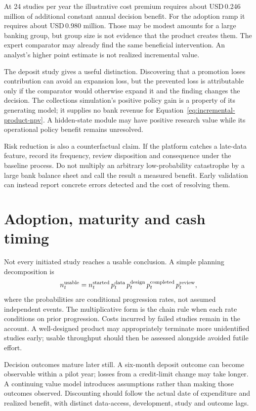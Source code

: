 At 24 studies per year the illustrative cost premium requires about
USD\,0.246 million of additional constant annual decision benefit.
For the adoption ramp it requires about USD\,0.980 million. Those may be
modest amounts for a large banking group, but group size is not evidence
that the product creates them. The expert comparator may already find the
same beneficial intervention. An analyst's higher point estimate is not
realized incremental value.

The deposit study gives a useful distinction. Discovering that a promotion
loses contribution can avoid an expansion loss, but the prevented loss is
attributable only if the comparator would otherwise expand it and the
finding changes the decision. The collections simulation's positive policy
gain is a property of its generating model; it supplies no bank revenue
for Equation~\eqref{eq:incremental-product-npv}. A hidden-state module may
have positive research value while its operational policy benefit remains
unresolved.

Risk reduction is also a counterfactual claim. If the platform catches a
late-data feature, record its frequency, review disposition and consequence
under the baseline process. Do not multiply an arbitrary low-probability
catastrophe by a large bank balance sheet and call the result a measured
benefit. Early validation can instead report concrete errors detected and
the cost of resolving them.

\section{Adoption, maturity and cash timing}
Not every initiated study reaches a usable conclusion. A simple planning
decomposition is
\[
 n_t^{\rm usable}=n_t^{\rm started}\,
 p_t^{\rm data}\,p_t^{\rm design}\,p_t^{\rm completed}
 \,p_t^{\rm review},
\]
where the probabilities are conditional progression rates, not assumed
independent events. The multiplicative form is the chain rule when each
rate conditions on prior progression. Costs incurred by failed studies
remain in the account. A well-designed product may appropriately terminate
more unidentified studies early; usable throughput should then be assessed
alongside avoided futile effort.

Decision outcomes mature later still. A six-month deposit outcome can
become observable within a pilot year; losses from a credit-limit change
may take longer. A continuing value model introduces assumptions rather
than making those outcomes observed. Discounting should follow the actual
date of expenditure and realized benefit, with distinct data-access,
development, study and outcome lags.

